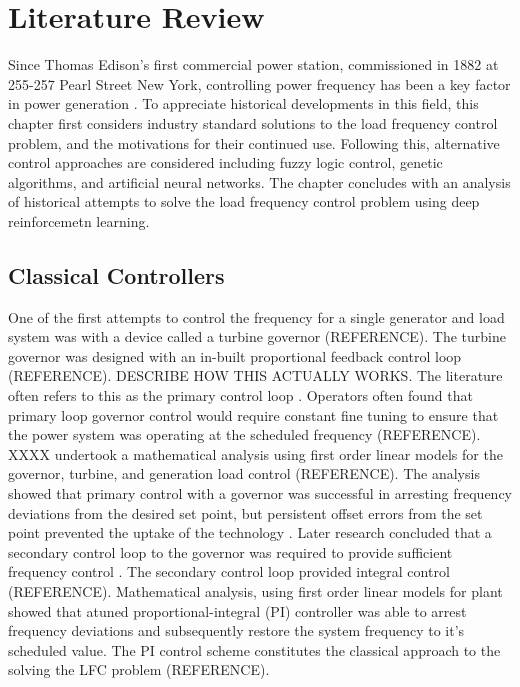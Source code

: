 \chapter{Literature Review}
Since Thomas Edison's first commercial power station, commissioned in 1882 at 255-257 Pearl Street New York, controlling power frequency has been a key factor in power generation \cite{Cohn1983}. To appreciate historical developments in this field, this chapter first considers industry standard solutions to the load frequency control problem, and the motivations for their continued use. Following this, alternative control approaches are considered including fuzzy logic control, genetic algorithms, and artificial neural networks. The chapter concludes with an analysis of historical attempts to solve the load frequency control problem using deep reinforcemetn learning.

\section{Classical Controllers}\label{agc}
One of the first attempts to control the frequency for a single generator and load system was with a device called a turbine governor (REFERENCE). The turbine governor was designed with an in-built proportional feedback control loop (REFERENCE). DESCRIBE HOW THIS ACTUALLY WORKS. The literature often refers to this as the primary control loop \cite{Bevrani2011}. Operators often found that primary loop governor control would require constant fine tuning to ensure that the power system was operating at the scheduled frequency (REFERENCE). XXXX undertook a mathematical analysis using first order linear models for the governor, turbine, and generation load control (REFERENCE). The analysis showed that primary control with a governor was successful in arresting frequency deviations from the desired set point, but persistent offset errors from the set point prevented the uptake of the technology \cite{Saadat2011}. Later research concluded that a secondary control loop to the governor was required to provide sufficient frequency control \cite{Elgerd1970}. The secondary control loop provided integral control (REFERENCE). Mathematical analysis, using first order linear models for plant showed that atuned proportional-integral (PI) controller was able to arrest frequency deviations and subsequently restore the system frequency to it's scheduled value. The PI control scheme constitutes the classical approach to the solving the LFC problem (REFERENCE).

